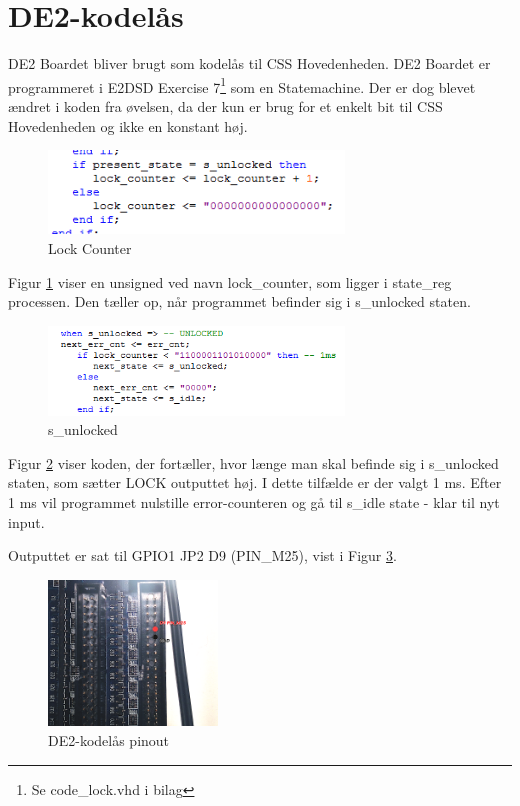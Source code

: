\section{DE2-kodelås}

DE2 Boardet bliver brugt som kodelås til CSS Hovedenheden. DE2 Boardet er programmeret i E2DSD Exercise 7\footnote{Se code\_lock.vhd i bilag} som en Statemachine. Der er dog blevet ændret i koden fra øvelsen, da der kun er brug for et enkelt bit til CSS Hovedenheden og ikke en konstant høj. 

\begin{figure}[H]
	\centering
	\includegraphics[width=0.70\textwidth]{billeder/HWdesign/code_lock_counter}
	\caption{Lock Counter}
	\label{code:code_lock}
\end{figure}

Figur \ref{code:code_lock} viser en unsigned ved navn lock\_counter, som ligger i state\_reg processen. Den tæller op, når programmet befinder sig i s\_unlocked staten.

\begin{figure}[H]
	\centering
	\includegraphics[width=0.70\textwidth]{billeder/HWdesign/code_lock_s_unlocked_state}
	\caption{s\_unlocked}
	\label{code:s_unlocked}
\end{figure}

Figur \ref{code:s_unlocked} viser koden, der fortæller, hvor længe man skal befinde sig i s\_unlocked staten, som sætter LOCK outputtet høj. I dette tilfælde er der valgt 1 ms. Efter 1 ms vil programmet nulstille error-counteren og gå til s\_idle state - klar til nyt input.

Outputtet er sat til GPIO1 JP2 D9 (PIN\_M25), vist i Figur \ref{code:code_lock_pinout}.

\begin{figure}[H]
	\centering
	\includegraphics[width=0.40\textwidth]{billeder/HWdesign/code_lock_pinout}
	\caption{DE2-kodelås pinout}
	\label{code:code_lock_pinout}
\end{figure}
\newpage
